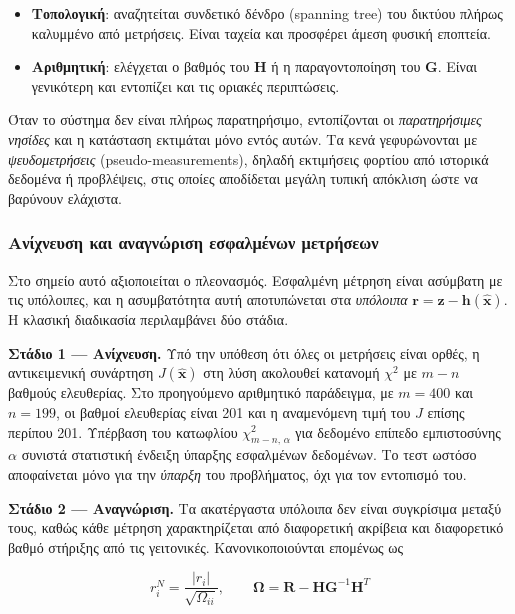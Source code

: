 \begin{itemize}
\item \textbf{Τοπολογική}: αναζητείται συνδετικό δένδρο (spanning tree) του δικτύου πλήρως
      καλυμμένο από μετρήσεις. Είναι ταχεία και προσφέρει άμεση φυσική εποπτεία.
\item \textbf{Αριθμητική}: ελέγχεται ο βαθμός του $\mathbf{H}$ ή η παραγοντοποίηση του
      $\mathbf{G}$. Είναι γενικότερη και εντοπίζει και τις οριακές περιπτώσεις.
\end{itemize}

Όταν το σύστημα δεν είναι πλήρως παρατηρήσιμο, εντοπίζονται οι \emph{παρατηρήσιμες νησίδες}
και η κατάσταση εκτιμάται μόνο εντός αυτών. Τα κενά γεφυρώνονται με \emph{ψευδομετρήσεις}
(pseudo-measurements), δηλαδή εκτιμήσεις φορτίου από ιστορικά δεδομένα ή προβλέψεις, στις
οποίες αποδίδεται μεγάλη τυπική απόκλιση ώστε να βαρύνουν ελάχιστα.

\subsubsection*{Ανίχνευση και αναγνώριση εσφαλμένων μετρήσεων}

Στο σημείο αυτό αξιοποιείται ο πλεονασμός. Εσφαλμένη μέτρηση είναι ασύμβατη με τις
υπόλοιπες, και η ασυμβατότητα αυτή αποτυπώνεται στα \emph{υπόλοιπα}
$\mathbf{r} = \mathbf{z}-\mathbf{h}(\hat{\mathbf{x}})$. Η κλασική διαδικασία περιλαμβάνει
δύο στάδια.

\textbf{Στάδιο 1 --- Ανίχνευση.} Υπό την υπόθεση ότι όλες οι μετρήσεις είναι ορθές, η
αντικειμενική συνάρτηση $J(\hat{\mathbf{x}})$ στη λύση ακολουθεί κατανομή $\chi^2$ με
$m-n$ βαθμούς ελευθερίας. Στο προηγούμενο αριθμητικό παράδειγμα, με $m = 400$ και
$n = 199$, οι βαθμοί ελευθερίας είναι 201 και η αναμενόμενη τιμή του $J$ επίσης περίπου
201. Υπέρβαση του κατωφλίου $\chi^2_{m-n,\,\alpha}$ για δεδομένο επίπεδο εμπιστοσύνης
$\alpha$ συνιστά στατιστική ένδειξη ύπαρξης εσφαλμένων δεδομένων. Το τεστ ωστόσο
αποφαίνεται μόνο για την \emph{ύπαρξη} του προβλήματος, όχι για τον εντοπισμό του.

\textbf{Στάδιο 2 --- Αναγνώριση.} Τα ακατέργαστα υπόλοιπα δεν είναι συγκρίσιμα μεταξύ τους,
καθώς κάθε μέτρηση χαρακτηρίζεται από διαφορετική ακρίβεια και διαφορετικό βαθμό στήριξης
από τις γειτονικές. Κανονικοποιούνται επομένως ως

\begin{equation}
r_i^{N} = \frac{|r_i|}{\sqrt{\Omega_{ii}}}, \qquad
\boldsymbol{\Omega} = \mathbf{R} - \mathbf{H}\mathbf{G}^{-1}\mathbf{H}^{T}
\label{eq:normres}
\end{equation}

